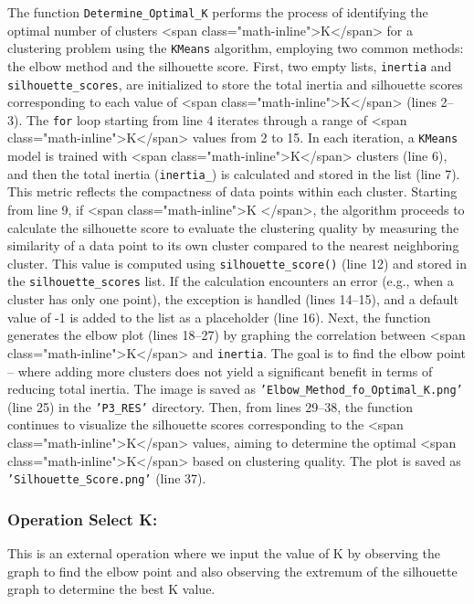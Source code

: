 \documentclass[12pt]{report}
\begin{document}
{{{\begin{lstlisting}
\end{lstlisting}
The function \texttt{Determine\_Optimal\_K} performs the process of identifying the optimal number of clusters <span class="math-inline">K</span> for a clustering problem using the \texttt{KMeans} algorithm, employing two common methods: the elbow method and the silhouette score. First, two empty lists, \texttt{inertia} and \texttt{silhouette\_scores}, are initialized to store the total inertia and silhouette scores corresponding to each value of <span class="math-inline">K</span> (lines 2–3). The \texttt{for} loop starting from line 4 iterates through a range of <span class="math-inline">K</span> values from 2 to 15. In each iteration, a \texttt{KMeans} model is trained with <span class="math-inline">K</span> clusters (line 6), and then the total inertia (\texttt{inertia\_}) is calculated and stored in the list (line 7). This metric reflects the compactness of data points within each cluster. Starting from line 9, if <span class="math-inline">K </span>, the algorithm proceeds to calculate the silhouette score to evaluate the clustering quality by measuring the similarity of a data point to its own cluster compared to the nearest neighboring cluster. This value is computed using \texttt{silhouette\_score()} (line 12) and stored in the \texttt{silhouette\_scores} list. If the calculation encounters an error (e.g., when a cluster has only one point), the exception is handled (lines 14–15), and a default value of -1 is added to the list as a placeholder (line 16). Next, the function generates the elbow plot (lines 18–27) by graphing the correlation between <span class="math-inline">K</span> and \texttt{inertia}. The goal is to find the elbow point – where adding more clusters does not yield a significant benefit in terms of reducing total inertia. The image is saved as \texttt{'Elbow\_Method\_fo\_Optimal\_K.png'} (line 25) in the \texttt{'P3\_RES'} directory. Then, from lines 29–38, the function continues to visualize the silhouette scores corresponding to the <span class="math-inline">K</span> values, aiming to determine the optimal <span class="math-inline">K</span> based on clustering quality. The plot is saved as \texttt{'Silhouette\_Score.png'} (line 37).
\subsubsection{Operation Select K:} This is an external operation where we input the value of K by observing the graph to find the elbow point and also observing the extremum of the silhouette graph to determine the best K value.
}}}
\end{document}
